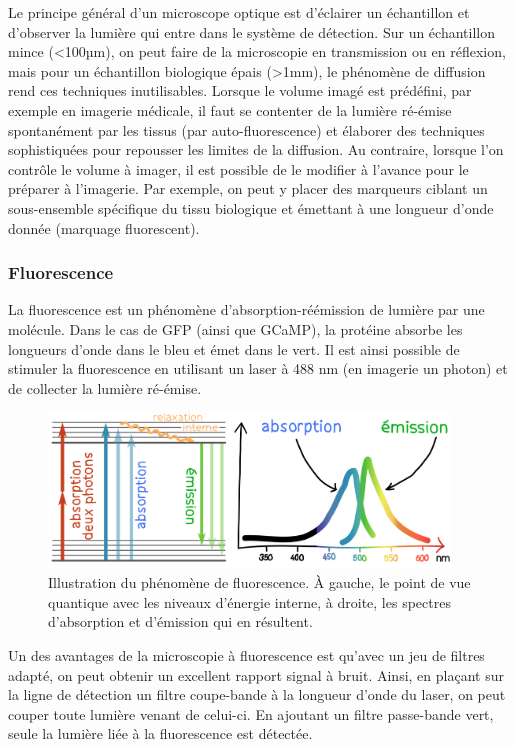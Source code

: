 Le principe général d'un microscope optique est d'éclairer un échantillon et d'observer la lumière qui entre dans le système de détection. Sur un échantillon mince (<100µm), on peut faire de la microscopie en transmission ou en réflexion, mais pour un échantillon biologique épais (>1mm), le phénomène de diffusion rend ces techniques inutilisables. Lorsque le volume imagé est prédéfini, par exemple en imagerie médicale, il faut se contenter de la lumière ré-émise spontanément par les tissus (par auto-fluorescence) et élaborer des techniques sophistiquées pour repousser les limites de la diffusion. Au contraire, lorsque l'on contrôle le volume à imager, il est possible de le modifier à l'avance pour le préparer à l'imagerie. Par exemple, on peut y placer des marqueurs ciblant un sous-ensemble spécifique du tissu biologique et émettant à une longueur d'onde donnée (marquage fluorescent).

\subsubsection{Fluorescence}

La fluorescence est un phénomène d’absorption-réémission de lumière par une molécule. Dans le cas de GFP (ainsi que GCaMP), la protéine absorbe les longueurs d'onde dans le bleu et émet dans le vert. Il est ainsi possible de stimuler la fluorescence en utilisant un laser à 488 nm (en imagerie un photon) et de collecter la lumière ré-émise. 

\begin{figure}
\centering
\includegraphics[width=0.95\textwidth]{./files/fluo_couleur.svg.png}
\caption{Illustration du phénomène de fluorescence. À gauche, le point de vue quantique avec les niveaux d'énergie interne, à droite, les spectres d’absorption et d'émission qui en résultent.}
\end{figure}

Un des avantages de la microscopie à fluorescence est qu'avec un jeu de filtres adapté, on peut obtenir un excellent rapport signal à bruit. Ainsi, en plaçant sur la ligne de détection un filtre coupe-bande à la longueur d'onde du laser, on peut couper toute lumière venant de celui-ci. En ajoutant un filtre passe-bande vert, seule la lumière liée à la fluorescence est détectée.


